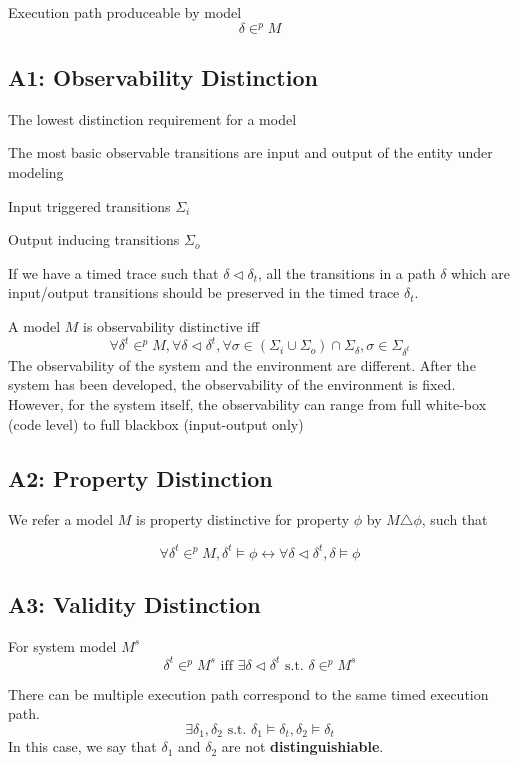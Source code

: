 \documentclass{llncs}
\begin{document}
Execution path produceable by model
$$\delta\in^p M$$
\subsection{A1: Observability Distinction}
The lowest distinction requirement for a model

The most basic observable transitions are input and output of the entity under modeling

Input triggered transitions $\Sigma_i$

Output inducing transitions $\Sigma_o$

If we have a timed trace such that $\delta\triangleleft\delta_t$, all the transitions in a path $\delta$ which are input/output transitions should be preserved in the timed trace $\delta_t$. 

A model $M$ is observability distinctive iff
$$\forall\delta^t\in^p M, \forall\delta\triangleleft\delta^t,\forall \sigma\in(\Sigma_i\cup\Sigma_o)\cap\Sigma_\delta,\sigma\in\Sigma_{\delta^t}$$
The observability of the system and the environment are different. After the system has been developed, the observability of the environment is fixed. However, for the system itself, the observability can range from full white-box (code level) to full blackbox (input-output only)

\subsection{A2: Property Distinction}
We refer a model $M$ is property distinctive for property $\phi$ by $M\triangle\phi$, such that

$$\forall \delta^t\in^p M, \delta^t\models\phi\leftrightarrow\forall \delta\triangleleft\delta^t,  \delta\models\phi$$

\subsection{A3: Validity Distinction}


For system model $M^s$
$$\delta^t\in^p M^s \text{ iff }\exists\delta\triangleleft\delta^t\text{ s.t. } \delta\in^p M^s$$


There can be multiple execution path correspond to the same timed execution path. 
$$\exists \delta_1,\delta_2\text{ s.t. } \delta_1\models\delta_t,\delta_2\models\delta_t$$
In this case, we say that $\delta_1$ and $\delta_2$ are not \textbf{distinguishiable}. 
\end{document}
